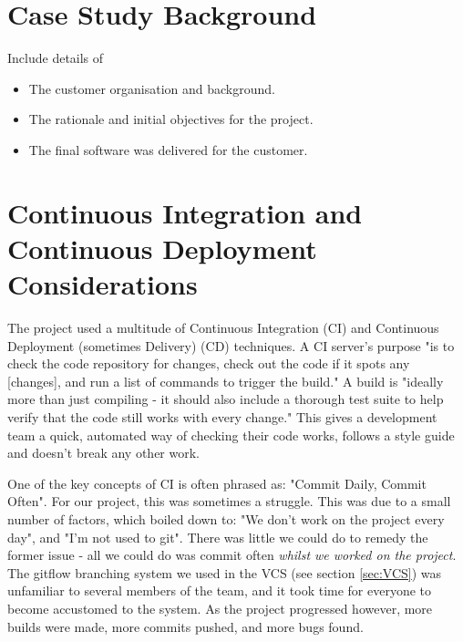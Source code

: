 \documentclass{l3proj}
\begin{document}
\section{Case Study Background}
\label{sec:background}

Include details of

\begin{itemize}
\item The customer organisation and background.
\item The rationale and initial objectives for the project.
\item The final software was delivered for the customer.
\end{itemize}

%
\newpage
\section{Continuous Integration and Continuous Deployment Considerations}
\label{sec:cicd}

The project used a multitude of Continuous Integration (CI) and Continuous
 Deployment (sometimes Delivery) (CD) techniques. A CI server's purpose "is to check the code
 repository for changes, check out the code if it spots any [changes], and run a
 list of commands to trigger the build."\cite{meyer2014continuous} A build is "ideally more than just
 compiling - it should also include a thorough test suite to help verify that the code
 still works with every change."\cite{meyer2014continuous} This gives a development
 team a quick, automated way of checking their code works, follows a style guide and
 doesn't break any other work. 
 
One of the key concepts of CI is often phrased as: "Commit Daily, 
 Commit Often"\cite{meyer2014continuous}. For our project, this was sometimes a struggle. 
 This was due to a small number of factors, which boiled down to: "We don't work on the project 
 every day", and "I'm not used to git". There was little we could do to remedy the former issue - 
 all we could do was commit often \textit{whilst we worked on the project}. The gitflow 
 branching system we used in the VCS (see section \ref{sec:VCS}) was unfamiliar to several 
 members of the team, and it took time for everyone to become accustomed to the system. As the
 project progressed however, more builds were made, more commits pushed, and more bugs found.
\end{document}
